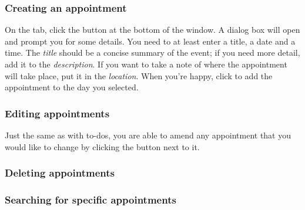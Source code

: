 \subsubsection{Creating an appointment}


On the  tab, click the  button at
the bottom of the window. A dialog box will open and prompt you for some
details. You need to at least enter a title, a date and a time. The
\textit{title} should be a concise summary of the event; if you need more
detail, add it to the \textit{description}. If you want to take a note of where
the appointment will take place, put it in the \textit{location}. When you're
happy, click  to add the appointment to the day you selected.



\subsubsection{Editing appointments}


Just the same as with to-dos, you are able to amend any appointment that you
would like to change by clicking the  button next to it.


\subsubsection{Deleting appointments}



\subsubsection{Searching for specific appointments}
